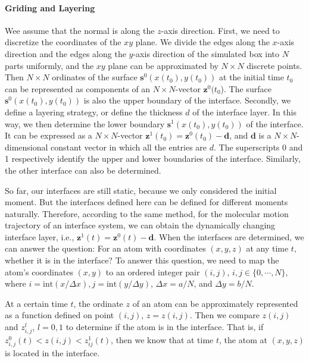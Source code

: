 \paragraph{Griding and Layering}
Wee assume that the normal is along the $z$-axis direction. 
First, we need to discretize the coordinates of the $xy$ plane. 
We divide the edges along the $x$-axis direction and the edges along the $y$-axis direction of the simulated box into $N$ parts uniformly, 
and the $xy$ plane can be approximated by $N\times N$ discrete points. 
Then $N\times N$ ordinates of the surface ${\mathbf s}^0(x(t_0),y(t_0))$ at the initial time $t_0$ can be represented as components of an $N\times N$-vector ${\mathbf z}^0(t_0$). 
The surface ${\mathbf s}^0(x(t_0),y(t_0))$ is also the upper boundary of the interface.
Secondly, we define a layering strategy, or define the thickness $d$ of the interface layer. 
In this way, we then determine the lower boundary ${\mathbf s}^1(x(t_0),y(t_0))$ of the interface. 
It can be expressed as a $N\times N$-vector ${\mathbf z}^1(t_0)={\mathbf z}^0(t_0)-{\mathbf d}$, and ${\mathbf d}$ is a $N\times N$-dimensional constant 
vector in which all the entries are $d$. The superscripts 0 and 1 respectively identify the upper and lower boundaries of the interface. 
Similarly, the other interface can also be determined.

So far, our interfaces are still static, because we only considered the initial moment. 
But the interfaces defined here can be defined for different moments naturally. 
Therefore, according to the same method, for the molecular motion trajectory of an interface system, 
we can obtain the dynamically changing interface layer, i.e., ${\mathbf z}^1(t)={\mathbf z}^0(t)-{\mathbf d}$. 
When the interfaces are determined, we can answer the question: For an atom with coordinates $(x, y, z)$ at any time $t$, whether it is in the interface?
To answer this question, we need to map the atom's coordinates $(x, y)$ to an ordered integer pair $(i, j)$, $i,j \in  \{0,\cdots,N\}$, 
where $i = \text{int}(x /\Delta x), j = \text{int}(y/\Delta y)$, $\Delta x = a/N$, and $\Delta y = b/N$.
 
At a certain time $t$, the ordinate $z$ of an atom can be approximately represented as a function defined on point $(i, j)$, $z=z(i,j)$. 
Then we compare $z(i,j)$ and $z^l_{i,j}$, $l=0,1$ to determine if the atom is in the interface. 
That is, if $z^0_{i,j}(t)<z(i,j)<z^1_{ij}(t)$, then we know that at time $t$, the atom at $(x,y,z)$ is located in the interface.

